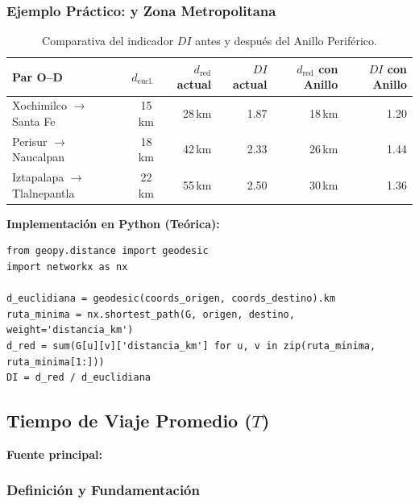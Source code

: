 \subsubsection{Ejemplo Práctico: \cdmx{} y Zona Metropolitana}
 
\begin{table}[H]
    \centering
    \caption{Comparativa del indicador $DI$ antes y después del Anillo Periférico.}
    \label{tab:detour-factor}
    \begin{tabularx}{\textwidth}{X r r r r r}
        \toprule
        \textbf{Par O--D} &
        $d_{\text{eucl.}}$ &
        $d_{\text{red}}$ actual &
        $DI$ actual &
        $d_{\text{red}}$ con Anillo &
        $DI$ con Anillo \\
        \midrule
        Xochimilco $\to$ Santa Fe    & 15\,km & 28\,km & 1.87 & 18\,km & 1.20 \\
        Perisur $\to$ Naucalpan      & 18\,km & 42\,km & 2.33 & 26\,km & 1.44 \\
        Iztapalapa $\to$ Tlalnepantla & 22\,km & 55\,km & 2.50 & 30\,km & 1.36 \\
        \bottomrule
    \end{tabularx}
\end{table}
 
\textbf{Implementación en Python (Teórica):}
 
\begin{lstlisting}[style=estiloPython, caption={Cálculo del \textit{Detour Factor} $DI$.}, label={lst:detour}]
from geopy.distance import geodesic
import networkx as nx
 
d_euclidiana = geodesic(coords_origen, coords_destino).km
ruta_minima = nx.shortest_path(G, origen, destino, weight='distancia_km')
d_red = sum(G[u][v]['distancia_km'] for u, v in zip(ruta_minima, ruta_minima[1:]))
DI = d_red / d_euclidiana
\end{lstlisting}

\subsection{Tiempo de Viaje Promedio \texorpdfstring{($T$)}{(T)}}
\label{subsec:tiempo-viaje}
 
\textbf{Fuente principal:} \citet{aldous2019optimal}
 
\subsubsection{Definición y Fundamentación}
 
